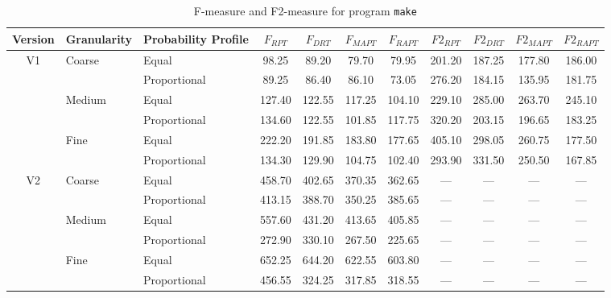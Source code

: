 \documentclass[10pt,journal,compsoc]{IEEEtran}
\begin{document}
\begin{table}
\caption{F-measure and F2-measure for program \texttt{make}}
\label{tab:Fmake}
\centering
\begin{tabular}{|c|l|l|c|c|c|c|c|c|c|c|} \hline
Version	& Granularity	& Probability Profile	& $F_{RPT}$	& $F_{DRT}$	& $F_{MAPT}$	& $F_{RAPT}$	& $F2_{RPT}$	& $F2_{DRT}$	& $F2_{MAPT}$	 & $F2_{RAPT}$	\\ \hline
V1	& Coarse	& Equal	& 98.25	& 89.20	& 79.70	& 79.95	& 201.20	& 187.25	& 177.80	& 186.00	\\ \cline{3-11}
	& 	& Proportional	& 89.25	& 86.40	& 86.10	& 73.05	& 276.20	& 184.15	& 135.95	& 181.75	\\ \cline{2-11}
	& Medium	& Equal	& 127.40	& 122.55	& 117.25	& 104.10	& 229.10	& 285.00	& 263.70	& 245.10	\\ \cline{3-11}
	& 	& Proportional	& 134.60	& 122.55	& 101.85	& 117.75	& 320.20	& 203.15	& 196.65	& 183.25	\\ \cline{2-11}
	& Fine	& Equal	& 222.20	& 191.85	& 183.80	& 177.65	& 405.10	& 298.05	& 260.75	& 177.50	\\ \cline{3-11}
	& 	& Proportional	& 134.30	& 129.90	& 104.75	& 102.40	& 293.90	& 331.50	& 250.50	& 167.85	\\ \hline
V2	& Coarse	& Equal	& 458.70	& 402.65	& 370.35	& 362.65	& ---	& ---	& ---	& ---	\\ \cline{3-11}
	& 	& Proportional	& 413.15	& 388.70	& 350.25	& 385.65	& ---	& ---	& ---	& ---	\\ \cline{2-11}
	& Medium	& Equal	& 557.60	& 431.20	& 413.65	& 405.85	& ---	& ---	& ---	& ---	\\ \cline{3-11}
	& 	& Proportional	& 272.90	& 330.10	& 267.50	& 225.65	& ---	& ---	& ---	& ---	\\ \cline{2-11}
	& Fine	& Equal	& 652.25	& 644.20	& 622.55	& 603.80	& ---	& ---	& ---	& ---	\\ \cline{3-11}
	& 	& Proportional	& 456.55	& 324.25	& 317.85	& 318.55	& ---	& ---	& ---	& ---	\\ \hline
\end{tabular}
\end{table}
\end{document}
